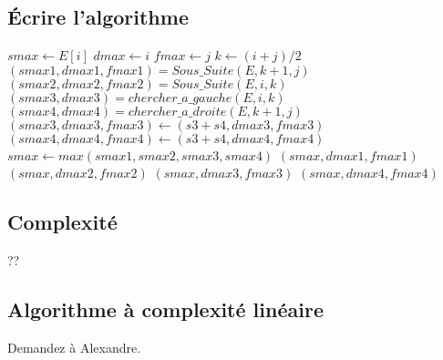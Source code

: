 \documentclass[11pt,a4paper]{article}
\begin{document}
	\subsection{Écrire l'algorithme}
	
	\begin{algorithm}
		\begin{algorithmic}[1]
				 
					\State $smax \gets E[i]$
					\State $dmax \gets i$
					\State $fmax \gets j$
				\Else
					\State $k \gets (i + j) / 2$
				\EndIf
				\State $(smax1, dmax1, fmax1) = Sous\_Suite(E, k+1, j)$ 
				\State $(smax2, dmax2, fmax2) = Sous\_Suite(E, i, k)$
				\State $(smax3, dmax3) = chercher\_a\_gauche(E, i, k)$
				\State $(smax4, dmax4) = chercher\_a\_droite(E, k+1, j)$
				\State $(smax3, dmax3, fmax3) \gets (s3 + s4, dmax3, fmax3)$ 
				\State $(smax4, dmax4, fmax4) \gets (s3 + s4, dmax4, fmax4)$ 
				\State $smax \gets max(smax1, smax2, smax3, smax4)$ 
					\State \Return $(smax, dmax1, fmax1)$
					\State \Return $(smax, dmax2, fmax2)$
					\State \Return $(smax, dmax3, fmax3)$
				\Else
					\State \Return $(smax, dmax4, fmax4)$
				\EndIf
			\EndFunction
		\end{algorithmic}
	\end{algorithm}
	
	\subsection{Complexité}
	
	??
	
	\subsection{Algorithme à complexité linéaire}
	
	Demandez à Alexandre.
	
\end{document}
